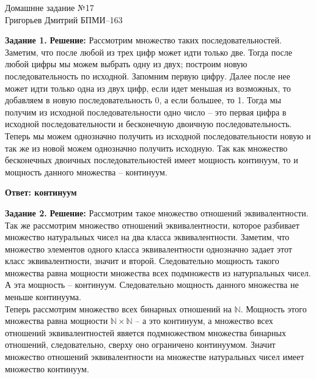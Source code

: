 \documentclass[12pt,a4paper]{scrartcl}
\begin{document}
	\begin{center}	
		Домашнне задание №17 \\
		Григорьев Дмитрий БПМИ--163
	\end{center}
	\textbf{Задание 1.}
	\newline
	\textbf{Решение:}
	\newline
	\indent
	Рассмотрим множество таких последовательностей. Заметим, что после любой из трех цифр может идти только две. Тогда после любой цифры мы можем выбрать одну из двух; построим новую последовательность по исходной. Запомним первую цифру. Далее после нее может идти только одна из двух цифр, если идет меньшая из возможных, то добавляем в новую последовательность 0, а если большее, то 1. Тогда мы получим из исходной последовательности одно число -- это первая цифра в исходной последовательности и бесконечную двоичную последовательность.
	Теперь мы можем однозначно получить из исходной последовательности новую и так же из новой можем однозначно получить исходную. Так как множество бесконечных двоичных последовательностей имеет мощность континуум, то и мощность данного множества -- континуум.
	\begin{flushright}	
		\textbf{Ответ: континуум}
	\end{flushright} 
	\textbf{Задание 2.} 
	\newline
	\textbf{Решение:}
	\newline
	\indent
	Рассмотрим такое множество отношений эквивалентности. Так же рассмотрим множество отношений эквивалентности, которое разбивает множество натуральных чисел на два класса эквивалентности. Заметим, что множество элементов одного класса эквивалентности однозначно задает этот класс эквивалентности, значит и второй. Следовательно мощность такого множества равна мощности множества всех подмножеств из натурпальных чисел. А эта мощность -- континуум. Следовательно мощность данного множества не меньше континуума. \\
	Теперь рассмотрим множество всех бинарных отношений на $\mathbb{N}$. Мощность этого множества равна мощности $\mathbb{N} \times \mathbb{N} $ -- а это континуум, а множество всех отношений эквивалентностей явяется подмножеством множества бинарных отношений, следовательно, сверху оно ограничено континуумом. Значит множество отношений эквивалентности на множестве натуральных чисел	имеет множество континуум. \\
	
\end{document}
